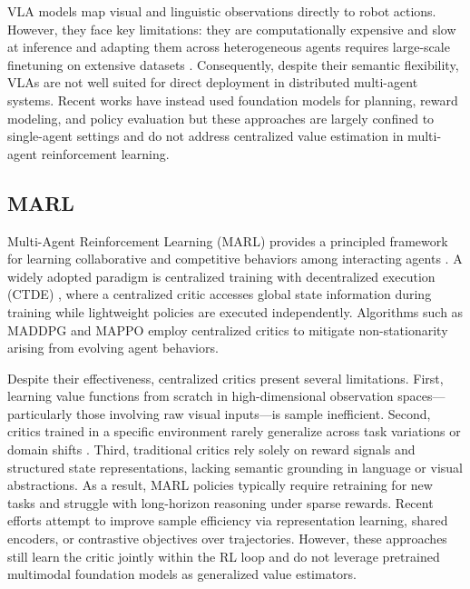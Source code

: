 \documentclass[letterpaper, 10 pt, conference]{ieeeconf}  %
\begin{document}
VLA models map visual and linguistic observations directly to robot actions. However, they face key limitations: they are computationally expensive and slow at inference \cite{zitkovich2023rt} and adapting them across heterogeneous agents requires large-scale finetuning on extensive datasets \cite{bousmalis2023robocat}. Consequently, despite their semantic flexibility, VLAs are not well suited for direct deployment in distributed multi-agent systems. Recent works have instead used foundation models for planning, reward modeling, and policy evaluation \cite{xie2023text2reward} but these approaches are largely confined to single-agent settings and do not address centralized value estimation in multi-agent reinforcement learning.


\subsection{MARL}

Multi-Agent Reinforcement Learning (MARL) provides a principled framework for learning collaborative and competitive behaviors among interacting agents \cite{oroojlooy2023review}. A widely adopted paradigm is centralized training with decentralized execution (CTDE) \cite{amato2024introduction}, where a centralized critic accesses global state information during training while lightweight policies are executed independently. Algorithms such as MADDPG \cite{lowe2017multi} and MAPPO \cite{yu2022surprising} employ centralized critics to mitigate non-stationarity arising from evolving agent behaviors.

Despite their effectiveness, centralized critics present several limitations. First, learning value functions from scratch in high-dimensional observation spaces—particularly those involving raw visual inputs—is sample inefficient. Second, critics trained in a specific environment rarely generalize across task variations or domain shifts \cite{cobbe2019quantifying}. Third, traditional critics rely solely on reward signals and structured state representations, lacking semantic grounding in language or visual abstractions. As a result, MARL policies typically require retraining for new tasks and struggle with long-horizon reasoning under sparse rewards. Recent efforts attempt to improve sample efficiency via representation learning, shared encoders, or contrastive objectives over trajectories.  However, these approaches still learn the critic jointly within the RL loop and do not leverage pretrained multimodal foundation models as generalized value estimators.
\end{document}
